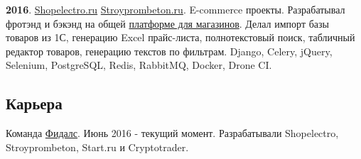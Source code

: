 \documentclass[12pt]{article}
\begin{document}
\medskip
\textbf{2016}. \href{https://github.com/fidals/shopelectro}{Shopelectro.ru} \href{https://github.com/fidals/stroyprombeton}{Stroyprombeton.ru}.
E-commerce проекты. Разрабатывал фротэнд и бэкэнд на общей \href{https://github.com/fidals/refarm-site}{платформе для магазинов}.
Делал импорт базы товаров из 1С, генерацию Excel прайс-листа, полнотекстовый поиск, табличный редактор товаров, генерацию текстов по фильтрам.
Django, Celery, jQuery, Selenium, PostgreSQL, Redis, RabbitMQ, Docker, Drone CI.

\subsection*{Карьера}
Команда \href{https://github.com/fidals}{Фидалс}. Июнь 2016 - текущий момент.
Разрабатывали Shopelectro, Stroyprombeton, Start.ru и Cryptotrader.
\end{document}
